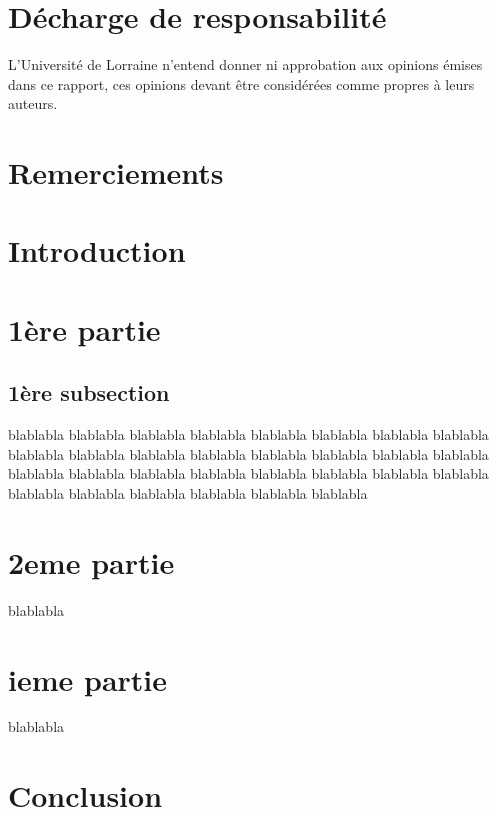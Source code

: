 \documentclass[11pt]{article}
\begin{document}
\newpage \newpage
\section*{Décharge de responsabilité }\bigbreak
L'Université de Lorraine n'entend donner ni approbation aux opinions émises dans ce rapport,
ces opinions devant être considérées comme propres à leurs auteurs. \bigbreak

\newpage
\section*{Remerciements}


\newpage
\tableofcontents
\newpage

\setcounter{page}{1}
\section*{Introduction}



\section{1ère partie}
\subsection{1ère subsection}
blablabla blablabla blablabla blablabla blablabla blablabla blablabla blablabla blablabla blablabla
blablabla blablabla blablabla blablabla blablabla
blablabla blablabla blablabla blablabla blablabla
blablabla blablabla blablabla blablabla blablabla
blablabla blablabla blablabla blablabla blablabla

\section{2eme partie}
blablabla
\section{ieme partie}
blablabla
\section*{Conclusion}
\end{document}
